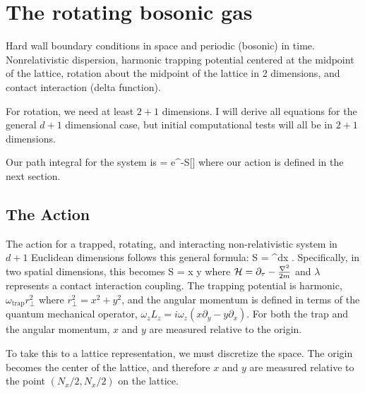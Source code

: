 \documentclass[../../RotatingBosons.tex]{subfiles}
\begin{document}
\section{The rotating bosonic gas}
Hard wall boundary conditions in space and periodic (bosonic) in time. Nonrelativistic dispersion, harmonic trapping potential centered at the midpoint of the lattice, rotation about the midpoint of the lattice in 2 dimensions, and contact interaction (delta function).

For rotation, we need at least $2+1$ dimensions. I will derive all equations for the general $d+1$ dimensional case, but initial computational tests will all be in $2+1$ dimensions.

Our path integral for the system is 
%
\beq
\CZ = \int \CD \phi e^{-S[\phi]}
\eeq
%
where our action is defined in the next section.
\subsection{The Action}
The action for a trapped, rotating, and interacting non-relativistic system in $d+1$ Euclidean dimensions follows this general formula:
%
\beq
S = \int \dif^{d}x \dif\tau {}.
\eeq 
%
Specifically, in two spatial dimensions, this becomes
%
\beq
S = \int \dif x \dif y \dif \tau {}
\eeq 
%
where ${\mathcal H} = \partial_{\tau} - \frac{{\nabla}^{2}}{2m} $ and $\lambda$ represents a contact interaction coupling. The trapping potential is harmonic, $\omega_{\text{trap}}r_{\perp}^{2}$ where $r_{\perp}^{2} = x^{2} + y^{2}$, and the angular momentum is defined in terms of the quantum mechanical operator, $\omega_{z}L_{z} = i \omega_{z}(x \partial_{y} - y\partial_{x})$. For both the trap and the angular momentum, $x$ and $y$ are measured relative to the origin.

To take this to a lattice representation, we must discretize the space. The origin becomes the center of the lattice, and therefore $x$ and $y$ are measured relative to the point $(N_{x}/2, N_{x}/2)$ on the lattice.
\end{document}
